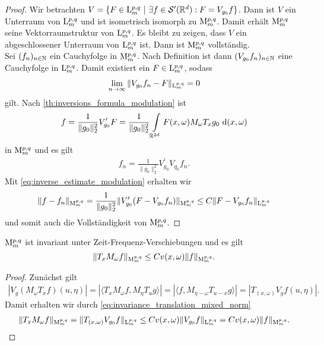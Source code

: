 \begin{proof}
	Wir betrachten $ V = \{ F \in \mathrm{L}_m^{p,q} \ | \ \exists f \in \mathcal{S}^\prime(\mathbb{R}^d) : F = V_{g_0} f \} $. Dann ist $ V $ ein Unterraum von $ \mathrm{L}_m^{p,q} $ und ist isometrisch isomorph zu $ \mathrm{M}_m^{p,q} $. Damit erhält $ \mathrm{M}_m^{p,q} $ seine Vektorraumstruktur von $ \mathrm{L}_m^{p,q} $.
	Es bleibt zu zeigen, dass $ V $ ein abgeschlossener Unterraum von $ \mathrm{L}^{p,q}_m $ ist. Dann ist $ \mathrm{M}_m^{p,q} $ vollständig.\\
	Sei $ (f_n)_{n \in \mathbb{N}} $ ein Cauchyfolge in $ \mathrm{M}_m^{p,q} $. Nach Definition ist dann $ (V_{g_0}  f_n)_{n \in \mathbb{N}} $ eine Cauchyfolge in $ \mathrm{L}_m^{p,q} $. Damit existiert ein $ F \in \mathrm{L}_m^{p,q}$, sodass
	\begin{align*}
	\lim \limits_{n \to \infty}
	\| V_{g_0} f_n - F \|_{\mathrm{L}_m^{p,q}} = 0
	\end{align*}
	gilt. Nach \ref{th:inversions_formula_modulation} ist
	\begin{align*}
	f = \frac{1}{\| g_0 \|^2_2} V_{g_0}^\prime F 
	= 
	\frac{1}{\| g_0 \|^2_2}
	\int \limits_{\mathbb{R}^{2d}} F(x,\omega) M_\omega T_x g_0 \text{ d} (x, \omega)
	\end{align*}
	in $ \mathrm{M}_m^{p,q} $ und es gilt 
	\begin{align*}
	f_n = \frac{1}{\| g_0 \|_2^2} V_{g_0}^\prime V_{g_0} f_n.
	\end{align*}
	Mit \eqref{eq:inverse_estimate_modulation} erhalten wir
	\begin{align*}
	\| f - f_n \|_{\mathrm{M}_m^{p,q}}
	=
	\frac{1}{\| g_0\|_2^2}
	\| V_{g_0}^\prime (F - V_{g_0} f_n) \|_{\mathrm{M}_m^{p,q}}
	\leq
	C \| F - V_{g_0} f_n \|_{\mathrm{L}_m^{p,q}}  
	\end{align*}
	und somit auch die Vollständigkeit von $ \mathrm{M}_{m}^{p,q} $.
\end{proof}


\begin{lem}\label{th:mod_space_tf_invariance}
	$ \mathrm{M}^{p,q}_m $ ist invariant unter Zeit-Frequenz-Verschiebungen und es gilt
	\begin{equation}\label{eq:mod_space_tf_invariance}
	\| T_x M_\omega f \|_{\mathrm{M}^{p,q}_m} \leq C v(x,\omega )  \|  f \|_{\mathrm{M}^{p,q}_m} .
	\end{equation}
\end{lem}

\begin{proof}
	Zunächst gilt
	\begin{align*}
	| V_g (M_\omega T_x f)(u , \eta) |
	=
	| \langle T_x M_\omega f , M_\eta T_u g \rangle |
	=
	| \langle f , M_{\eta - \omega} T_{u - x } g \rangle  |
	=
	| T_{(x,\omega) }V_g f(u,\eta) |.
 	\end{align*}
 	Damit erhalten wir durch \eqref{eq:invariance_translation_mixed_norm}
 	\begin{align*}
 	\| T_x M_\omega f\|_{\mathrm{M}_m^{p,q}}
 	=
 	\| T_{(x,\omega) } V_{g_0} f \|_{\mathrm{L}_m^{p,q}} 
 	\leq 
 	C v(x,\omega)  \| V_{g_0} f \|_{\mathrm{L}_m^{p,q}}
 	=
 	C v(x,\omega)  \|  f \|_{\mathrm{M}_m^{p,q}}.
 	\end{align*}
\end{proof}

